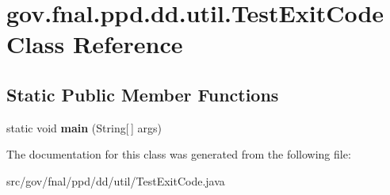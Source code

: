 \hypertarget{classgov_1_1fnal_1_1ppd_1_1dd_1_1util_1_1TestExitCode}{\section{gov.\-fnal.\-ppd.\-dd.\-util.\-Test\-Exit\-Code Class Reference}
\label{classgov_1_1fnal_1_1ppd_1_1dd_1_1util_1_1TestExitCode}
}
\subsection*{Static Public Member Functions}
\begin{DoxyCompactItemize}
\item 
\hypertarget{classgov_1_1fnal_1_1ppd_1_1dd_1_1util_1_1TestExitCode_ac64fda39c70246ab6b483f63c1cfae50}{static void {\bfseries main} (String\mbox{[}$\,$\mbox{]} args)}\label{classgov_1_1fnal_1_1ppd_1_1dd_1_1util_1_1TestExitCode_ac64fda39c70246ab6b483f63c1cfae50}

\end{DoxyCompactItemize}


The documentation for this class was generated from the following file\-:\begin{DoxyCompactItemize}
\item 
src/gov/fnal/ppd/dd/util/Test\-Exit\-Code.\-java\end{DoxyCompactItemize}
